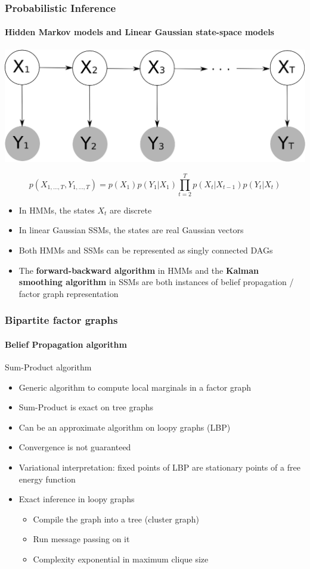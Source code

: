 \documentclass[slidestop,compress,mathserif]{beamer}
\newcommand{\bi}{\begin{itemize}}
\newcommand{\ei}{\end{itemize}}
\begin{document}
  \begin{frame}
	\frametitle{Probabilistic Inference}
    \framesubtitle{Hidden Markov models and Linear Gaussian state-space models}
\begin{center}
\includegraphics[width=.6\textwidth]{hmm}
\end{center}
$$p(X_{1,\hdots,T},Y_{1,\hdots,T}) = p(X_1)p(Y_1|X_1)\prod_{t=2}^T p(X_t|X_{t-1})p(Y_t|X_t)$$
\begin{itemize}
\item In HMMs, the states $X_t$ are discrete
\item In linear Gaussian SSMs, the states are real Gaussian vectors
\item Both HMMs and SSMs can be represented as singly connected DAGs
\item The \textbf{forward-backward algorithm} in HMMs and the \textbf{Kalman smoothing algorithm} in SSMs are both 
	instances of belief propagation / factor graph representation
\end{itemize}

\end{frame}

 
\begin{frame}
	\frametitle{Bipartite factor graphs}
    \framesubtitle{Belief Propagation algorithm}
    \begin{block}{Sum-Product algorithm}
    \bi
    \item Generic algorithm to compute local marginals in a factor graph
    \item Sum-Product is exact on tree graphs
    \item Can be an approximate algorithm on loopy graphs (LBP)
    \item Convergence is not guaranteed
    \item Variational interpretation:
    fixed points of LBP are stationary points of a free energy function
    \item Exact inference in loopy graphs
    \bi
    \item Compile the graph into a tree (cluster graph)
    \item Run message passing on it
    \item Complexity exponential in maximum clique size
    \ei
    \ei
    \end{block}
    
\end{frame}
\end{document}
